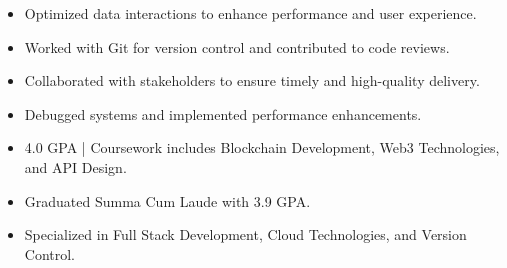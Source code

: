 \par\smallskip
\noindent
\begin{minipage}{20cm}
  \begin{minipage}{9.75cm}
    \begin{itemize}
      \item Optimized data interactions to enhance performance and user experience.
      \item Worked with Git for version control and contributed to code reviews.
    \end{itemize}
  \end{minipage}
  \hfill
  \begin{minipage}{9.75cm}
    \begin{itemize}
      \item Collaborated with stakeholders to ensure timely and high-quality delivery.
      \item Debugged systems and implemented performance enhancements.
    \end{itemize}
  \end{minipage}
\end{minipage}
\par\smallskip
\divider

\begin{itemize}
  \item 4.0 GPA | Coursework includes Blockchain Development, Web3 Technologies, and API Design.
\end{itemize}
\divider

\begin{itemize}
  \item Graduated Summa Cum Laude with 3.9 GPA.
  \item Specialized in Full Stack Development, Cloud Technologies, and Version Control.
\end{itemize}

\noindent
\begin{minipage}{20cm}
\end{minipage}


